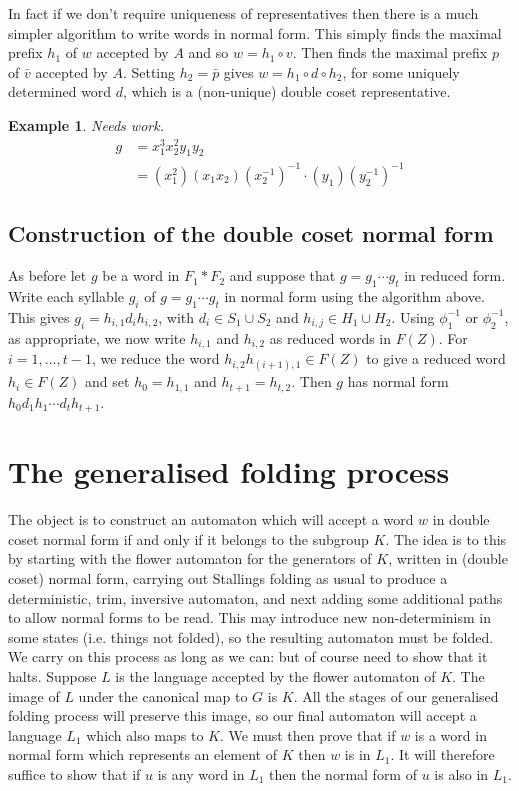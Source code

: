 \documentclass[a4paper,12pt]{article}
\newtheorem{exam}[theorem]{Example}
\newenvironment{example}{\begin{exam} \rm}{\end{exam}}
\numberwithin{equation}{section}
\numberwithin{figure}{section}
\begin{document}
In fact if we don't require uniqueness of representatives then there is 
a much simpler algorithm to write words in normal form. 
This  
simply finds the maximal prefix $h_1$ of $w$  accepted  by $A$  and so $w=h_1\circ v$. Then finds the
maximal prefix $p$ of $\bar v$ accepted by $A$. Setting $h_2=\bar p$ gives $w=h_1\circ d \circ h_2$, for
some uniquely determined word $d$, which is a (non-unique) 
double coset representative. 


\begin{example}
Needs work.
\begin{align*} 
g &= x_1^3x_2^2y_1y_2 \\ 
&= (x_1^2)(x_1x_2)(x_2^{-1})^{-1} \cdot (y_1)(y_2^{-1})^{-1}
\end{align*}
\end{example}

\subsection{Construction of the double coset normal form}

As before let $g$ be a word in $F_1\ast F_2$ and suppose that 
$g=g_1\cdots g_t$ in reduced form. 
Write each syllable $g_i$ of $g=g_1\cdots g_t$ in normal form using the algorithm above. 
This gives $g_i=h_{i,1}d_ih_{i,2}$, with $d_i\in S_1\cup S_2$ and 
$h_{i,j}\in H_1\cup H_2$. Using $\phi_1^{-1}$ or $\phi_2^{-1}$, as appropriate,
we now write $h_{i,1}$ and $h_{i,2}$ as reduced words in $F(Z)$. For $i=1,\ldots , t-1$, we reduce the 
word $h_{i,2}h_{(i+1),1}\in F(Z)$ to give a reduced word $h_i\in F(Z)$ and set $h_0=h_{1,1}$ and  $h_{t+1}=h_{t,2}$.
Then $g$ has normal form $h_0d_1h_1\cdots d_th_{t+1}$.
%
%
\section{The generalised folding process}
The object is to construct an automaton which will accept a word $w$
in double coset normal form if and only if it belongs to the subgroup $K$.
The idea is to this by starting with the flower automaton for the 
generators of $K$, written in (double coset) normal form, carrying out
Stallings folding as usual to produce a deterministic, trim, inversive 
automaton, and next adding some additional paths to allow normal forms
to be read. This may introduce new non-determinism in some  states (i.e.
things not folded), so
the resulting automaton must be folded. We carry on this process as long
as we can: but of course need to show that it halts. Suppose $L$ is the 
language accepted by the flower automaton of $K$. The image of $L$ under
the canonical map to $G$ is $K$. All the stages of our generalised folding
process will preserve this image, so our final automaton will accept a language
$L_1$ which also maps to $K$. We must then prove that if $w$ is a word
in normal form which represents an element of $K$ then $w$ is in $L_1$. It will
therefore suffice to show that if $u$ is any word in $L_1$ then the 
normal form of $u$ is also in $L_1$. 
\end{document}
